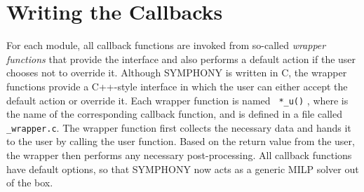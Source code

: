\section{Writing the Callbacks}

For each module, all callback functions are invoked from so-called \emph{wrapper
functions} that provide the interface and also performs a default action if
the user chooses not to override it. Although SYMPHONY is written in C, the
wrapper functions provide a C++-style interface in which the user can either
accept the default action or override it. Each wrapper function is named {\tt
*\_u()} , where {\tt *} is the name of the corresponding callback function, and is
defined in a file called {\tt *\_wrapper.c}. The wrapper function first
collects the necessary data and hands it to the user by calling the user
function. Based on the return value from the user, the wrapper then performs
any necessary post-processing. All callback functions have default options, so
that SYMPHONY now acts as a generic MILP solver out of the box.

